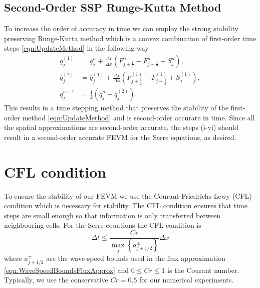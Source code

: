 \subsection{Second-Order SSP Runge-Kutta Method}
To increase the order of accuracy in time we can employ the strong stability preserving Runge-Kutta method \cite{Gottlieb-etal-2003-89} which is a convex combination of first-order time steps \eqref{eqn:UpdateMethod} in the following way
\begin{subequations}
\begin{align}
\overline{q}_j^{(1)} &= \overline{q}^{n}_j + \frac{\Delta t}{\Delta x} \left(F^n_{j+\frac{1}{2}} - F^n_{j-\frac{1}{2}} + S^n_j\right),\\
\overline{q}_j^{(2)} &= \overline{q}_j^{(1)} + \frac{\Delta t}{\Delta x} \left(F_{j+\frac{1}{2}}^{(1)} - F_{j-\frac{1}{2}}^{(1)}  + S_j^{(1)} \right), \\
\overline{q}^{n+1}_j &= \frac{1}{2} \left( \overline{q}^n_j +  \overline{q}_j^{(2)}  \right).
\end{align}
\label{eqn:SSPRKStep1}
\end{subequations}
This results in a time stepping method that preserves the stability of the first-order method \eqref{eqn:UpdateMethod} and is second-order accurate in time. Since all the spatial approximations are second-order accurate, the steps (i-vi) should result in a second-order accurate FEVM for the Serre equations, as desired. 


\section{CFL condition}
To ensure the stability of our FEVM we use the Courant-Friedrichs-Lewy (CFL) condition \cite{Courant-etal-1967-215} which is necessary for stability. The CFL condition ensures that time steps are small enough so that information is only transferred between neighbouring cells. For the Serre equations the CFL condition is 
\begin{equation}
\Delta t \le \frac{Cr }{\max_{j} \left\lbrace a^\pm_{j+1/2} \right\rbrace} \Delta x
\label{eqn:CFLcond}
\end{equation}
where $a^\pm_{j+1/2} $ are the wave-speed bounds used in the flux approximation \eqref{eqn:WaveSpeedBoundsFluxApprox} and $0\le Cr \le 1$ is the Courant number. Typically, we use the conservative $Cr = 0.5$ for our numerical experiments. 

